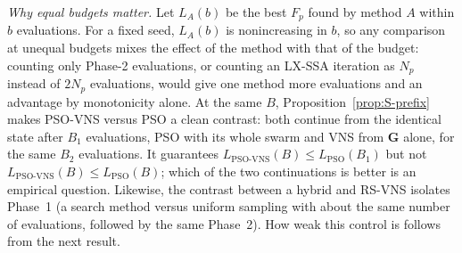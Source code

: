 \emph{Why equal budgets matter.} Let $L_A(b)$ be the best $F_p$ found by method $A$ within $b$ evaluations. For a fixed seed, $L_A(b)$ is nonincreasing in $b$, so any comparison at unequal budgets mixes the effect of the method with that of the budget: counting only Phase-2 evaluations, or counting an LX-SSA iteration as $N_p$ instead of $2N_p$ evaluations, would give one method more evaluations and an advantage by monotonicity alone. At the same $B$, Proposition~\ref{prop:S-prefix} makes PSO-VNS versus PSO a clean contrast: both continue from the identical state after $B_1$ evaluations, PSO with its whole swarm and VNS from $\mathbf G$ alone, for the same $B_2$ evaluations. It guarantees $L_{\text{PSO-VNS}}(B)\le L_{\text{PSO}}(B_1)$ but not $L_{\text{PSO-VNS}}(B)\le L_{\text{PSO}}(B)$; which of the two continuations is better is an empirical question. Likewise, the contrast between a hybrid and RS-VNS isolates Phase~1 (a search method versus uniform sampling with about the same number of evaluations, followed by the same Phase~2). How weak this control is follows from the next result.

